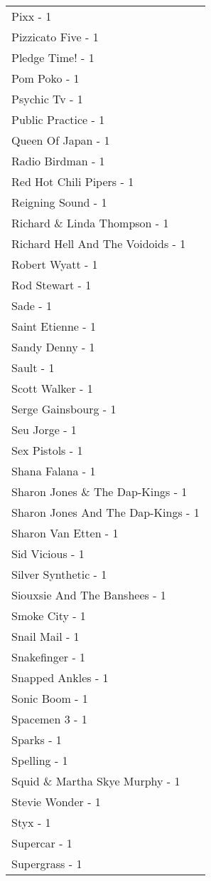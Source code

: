 \documentclass[
]{article}
\begin{document}
\begin{longtable}{l}
Pixx - 1 \\ 
Pizzicato Five - 1 \\ 
Pledge Time! - 1 \\ 
Pom Poko - 1 \\ 
Psychic Tv - 1 \\ 
Public Practice - 1 \\ 
Queen Of Japan - 1 \\ 
Radio Birdman - 1 \\ 
Red Hot Chili Pipers - 1 \\ 
Reigning Sound - 1 \\ 
Richard \& Linda Thompson - 1 \\ 
Richard Hell And The Voidoids - 1 \\ 
Robert Wyatt - 1 \\ 
Rod Stewart - 1 \\ 
Sade - 1 \\ 
Saint Etienne - 1 \\ 
Sandy Denny - 1 \\ 
Sault - 1 \\ 
Scott Walker - 1 \\ 
Serge Gainsbourg - 1 \\ 
Seu Jorge - 1 \\ 
Sex Pistols - 1 \\ 
Shana Falana - 1 \\ 
Sharon Jones \& The Dap-Kings - 1 \\ 
Sharon Jones And The Dap-Kings - 1 \\ 
Sharon Van Etten - 1 \\ 
Sid Vicious - 1 \\ 
Silver Synthetic - 1 \\ 
Siouxsie And The Banshees - 1 \\ 
Smoke City - 1 \\ 
Snail Mail - 1 \\ 
Snakefinger - 1 \\ 
Snapped Ankles - 1 \\ 
Sonic Boom - 1 \\ 
Spacemen 3 - 1 \\ 
Sparks - 1 \\ 
Spelling - 1 \\ 
Squid \& Martha Skye Murphy - 1 \\ 
Stevie Wonder - 1 \\ 
Styx - 1 \\ 
Supercar - 1 \\ 
Supergrass - 1 \\ 

\end{longtable}
\end{document}
